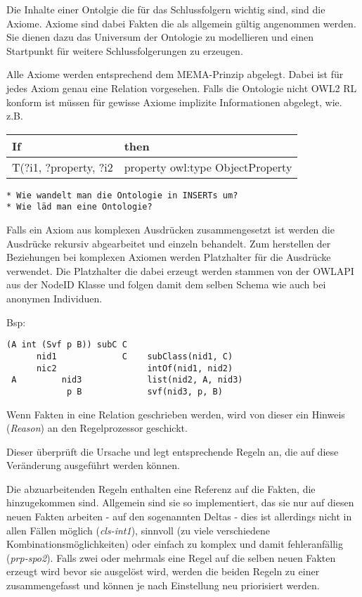 Die Inhalte einer Ontolgie die für das Schlussfolgern wichtig sind, sind die Axiome. Axiome sind dabei Fakten die als allgemein gültig angenommen werden. Sie dienen dazu das Universum der Ontologie zu modellieren und einen Startpunkt für weitere Schlussfolgerungen zu erzeugen.

Alle Axiome werden entsprechend dem MEMA-Prinzip abgelegt. Dabei ist für jedes Axiom genau eine Relation vorgesehen. Falls die Ontologie nicht OWL2 RL konform ist müssen für gewisse Axiome implizite Informationen abgelegt, wie. z.B.

\begin{table}
	\begin{tabular}{|l|l|}
    \hline
    If & then \\
    \hline
	T(?i1, ?property, ?i2 & property owl:type ObjectProperty \\
	\hline
    \end{tabular}
\end{table}


\begin{verbatim}
* Wie wandelt man die Ontologie in INSERTs um?
* Wie läd man eine Ontologie?
\end{verbatim}


Falls ein Axiom aus komplexen Ausdrücken zusammengesetzt ist werden die Ausdrücke rekursiv abgearbeitet und einzeln behandelt. Zum herstellen der Beziehungen bei komplexen Axiomen werden Platzhalter für die Ausdrücke verwendet. Die Platzhalter die dabei erzeugt werden stammen von der OWLAPI aus der NodeID Klasse und folgen damit dem selben Schema wie auch bei anonymen Individuen.

Bsp:
\begin{verbatim}
(A int (Svf p B)) subC C
      nid1             C    subClass(nid1, C)
      nic2                  intOf(nid1, nid2)
 A         nid3             list(nid2, A, nid3)
            p B             svf(nid3, p, B)
\end{verbatim}

Wenn Fakten in eine Relation geschrieben werden, wird von dieser ein Hinweis (\emph{Reason}) an den Regelprozessor geschickt.

Dieser überprüft die Ursache und legt entsprechende Regeln an, die auf diese Veränderung ausgeführt werden können.

Die abzuarbeitenden Regeln enthalten eine Referenz auf die Fakten, die hinzugekommen sind. Allgemein sind sie so implementiert, das sie nur auf diesen neuen Fakten arbeiten -  auf den sogenannten Deltas - dies ist allerdings nicht in allen Fällen möglich (\emph{cls-int1}), sinnvoll (zu viele verschiedene Kombinationsmöglichkeiten) oder einfach zu komplex und damit fehleranfällig (\emph{prp-spo2}). Falls zwei oder mehrmals eine Regel auf die selben neuen Fakten erzeugt wird bevor sie ausgelöst wird, werden die beiden Regeln zu einer zusammengefasst und können je nach Einstellung neu priorisiert werden.

